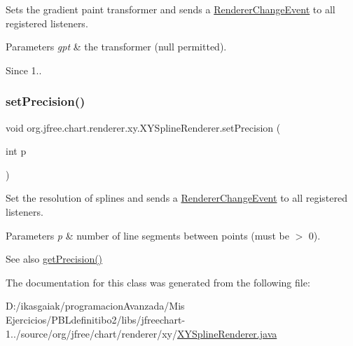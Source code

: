 Sets the gradient paint transformer and sends a \mbox{\hyperlink{}{Renderer\+Change\+Event}} to all registered listeners.


\begin{DoxyParams}{Parameters}
{\em gpt} & the transformer ({\ttfamily null} permitted).\\
\hline
\end{DoxyParams}
\begin{DoxySince}{Since}
1.. 
\end{DoxySince}
\mbox{\label{classorg_1_1jfree_1_1chart_1_1renderer_1_1xy_1_1_x_y_spline_renderer_aa54676920444e2e4dddd54b1684bd752}} 
\subsubsection{\texorpdfstring{set\+Precision()}{setPrecision()}}
{\footnotesize\ttfamily void org.\+jfree.\+chart.\+renderer.\+xy.\+X\+Y\+Spline\+Renderer.\+set\+Precision (\begin{DoxyParamCaption}\item[{int}]{p }\end{DoxyParamCaption})}

Set the resolution of splines and sends a \mbox{\hyperlink{}{Renderer\+Change\+Event}} to all registered listeners.


\begin{DoxyParams}{Parameters}
{\em p} & number of line segments between points (must be $>$ 0).\\
\hline
\end{DoxyParams}
\begin{DoxySeeAlso}{See also}
\mbox{\hyperlink{classorg_1_1jfree_1_1chart_1_1renderer_1_1xy_1_1_x_y_spline_renderer_ae6162076ed27c60c0d1c4732cb8fd218}{get\+Precision()}} 
\end{DoxySeeAlso}


The documentation for this class was generated from the following file\+:\begin{DoxyCompactItemize}
\item 
D\+:/ikasgaiak/programacion\+Avanzada/\+Mis Ejercicios/\+P\+B\+Ldefinitibo2/libs/jfreechart-\/1../source/org/jfree/chart/renderer/xy/\mbox{\hyperlink{_x_y_spline_renderer_8java}{X\+Y\+Spline\+Renderer.\+java}}\end{DoxyCompactItemize}

